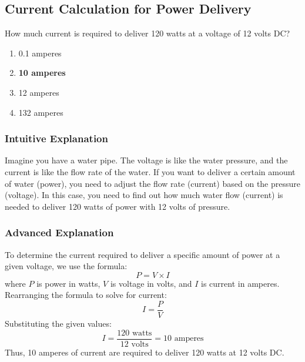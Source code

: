 \subsection{Current Calculation for Power Delivery}
\label{T5C11}

\begin{tcolorbox}[colback=gray!10!white,colframe=black!75!black,title=T5C11]
How much current is required to deliver 120 watts at a voltage of 12 volts DC?
\begin{enumerate}[noitemsep]
    \item 0.1 amperes
    \item \textbf{10 amperes}
    \item 12 amperes
    \item 132 amperes
\end{enumerate}
\end{tcolorbox}

\subsubsection*{Intuitive Explanation}
Imagine you have a water pipe. The voltage is like the water pressure, and the current is like the flow rate of the water. If you want to deliver a certain amount of water (power), you need to adjust the flow rate (current) based on the pressure (voltage). In this case, you need to find out how much water flow (current) is needed to deliver 120 watts of power with 12 volts of pressure.

\subsubsection*{Advanced Explanation}
To determine the current required to deliver a specific amount of power at a given voltage, we use the formula:
\[
P = V \times I
\]
where \( P \) is power in watts, \( V \) is voltage in volts, and \( I \) is current in amperes. Rearranging the formula to solve for current:
\[
I = \frac{P}{V}
\]
Substituting the given values:
\[
I = \frac{120 \text{ watts}}{12 \text{ volts}} = 10 \text{ amperes}
\]
Thus, 10 amperes of current are required to deliver 120 watts at 12 volts DC.